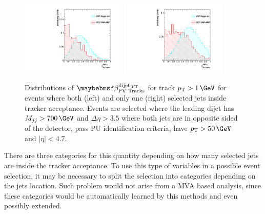 \begin{figure}[!htb]
\centering
\includegraphics[width=0.45\textwidth]{Chapter06/TrackVariables/Images/BB_Tracks1_TracksERatio.pdf}
\includegraphics[width=0.45\textwidth]{Chapter06/TrackVariables/Images/BE_Tracks1_TracksERatio.pdf}
\caption[Distributions of $\beta_{\text{PV Tracks}}^{\text{dijet }\pt}$ for track $\pt>1\,\GeV$ for events where both and only one selected jets inside tracker acceptance.]
{Distributions of $\beta_{\text{PV Tracks}}^{\text{dijet }\pt}$ for track $\pt>1\,\GeV$ for events where both (left) and only one (right) selected jets inside tracker acceptance. Events are selected where the leading dijet has $M_{jj}>700\,\GeV$ and $\Delta\eta>3.5$ where both jets are in opposite sided of the detector, pass \gls{PU} identification criteria, have $\pt>50\,\GeV$ and $|\eta|<4.7$.}
\label{FIGURE:PreparationParkedDataAnalysis_TrackDistributionVariables_Acceptance}
\end{figure}

There are three categories for this quantity depending on how many selected jets are inside the tracker acceptance. To use this type of variables in a possible event selection, it may be necessary to split the selection into categories depending on the jets location. Such problem would not arise from a \gls{MVA} based analysis, since these categories would be automatically learned by this methods and even possibly extended.

